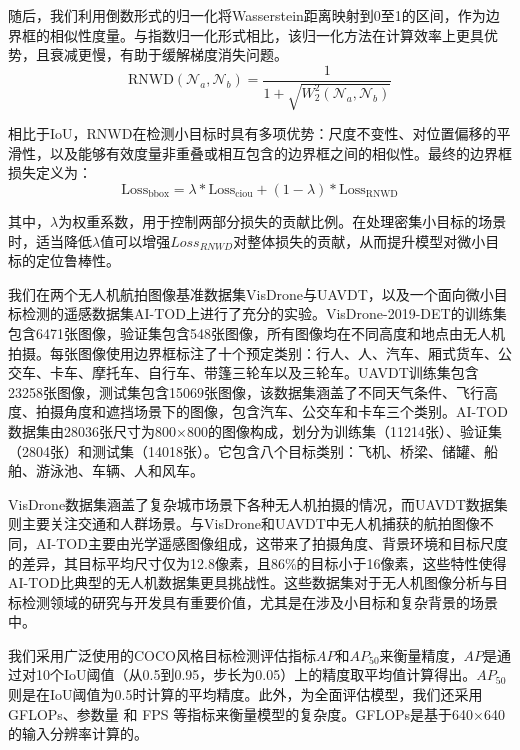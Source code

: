 随后，我们利用倒数形式的归一化将Wasserstein距离映射到0至1的区间，作为边界框的相似性度量。与指数归一化形式相比，该归一化方法在计算效率上更具优势，且衰减更慢，有助于缓解梯度消失问题。
\begin{equation}
    \text{RNWD}(\mathcal{N}_{a}, \mathcal{N}_{b}) = \frac{1}{1 + \sqrt{W_{2}^{2}(\mathcal{N}_{a}, \mathcal{N}_{b})}}
\end{equation}

相比于IoU，RNWD在检测小目标时具有多项优势：尺度不变性、对位置偏移的平滑性，以及能够有效度量非重叠或相互包含的边界框之间的相似性。最终的边界框损失定义为：
\begin{equation}
    \text{Loss}_{\text{bbox}} = \lambda * \text{Loss}_{\text{ciou}} + (1 - \lambda) * \text{Loss}_{\text{RNWD}}
\end{equation}

其中，$\lambda$为权重系数，用于控制两部分损失的贡献比例。在处理密集小目标的场景时，适当降低$\lambda$值可以增强$Loss_{RNWD}$对整体损失的贡献，从而提升模型对微小目标的定位鲁棒性。


我们在两个无人机航拍图像基准数据集VisDrone\cite{Cao2021VisDroneDET2021}与UAVDT\cite{Du2018UAVDT}，以及一个面向微小目标检测的遥感数据集AI-TOD\cite{Wang2021AITOD}上进行了充分的实验。VisDrone-2019-DET的训练集包含6471张图像，验证集包含548张图像，所有图像均在不同高度和地点由无人机拍摄。每张图像使用边界框标注了十个预定类别：行人、人、汽车、厢式货车、公交车、卡车、摩托车、自行车、带篷三轮车以及三轮车。UAVDT训练集包含23258张图像，测试集包含15069张图像，该数据集涵盖了不同天气条件、飞行高度、拍摄角度和遮挡场景下的图像，包含汽车、公交车和卡车三个类别。AI-TOD数据集由28036张尺寸为800×800的图像构成，划分为训练集（11214张）、验证集（2804张）和测试集（14018张）。它包含八个目标类别：飞机、桥梁、储罐、船舶、游泳池、车辆、人和风车。

VisDrone数据集涵盖了复杂城市场景下各种无人机拍摄的情况，而UAVDT数据集则主要关注交通和人群场景。与VisDrone和UAVDT中无人机捕获的航拍图像不同，AI-TOD主要由光学遥感图像组成，这带来了拍摄角度、背景环境和目标尺度的差异，其目标平均尺寸仅为12.8像素，且86\%的目标小于16像素，这些特性使得AI-TOD比典型的无人机数据集更具挑战性。这些数据集对于无人机图像分析与目标检测领域的研究与开发具有重要价值，尤其是在涉及小目标和复杂背景的场景中。

我们采用广泛使用的COCO风格目标检测评估指标$AP$和$AP_{50}$来衡量精度，$AP$是通过对10个IoU阈值（从0.5到0.95，步长为0.05）上的精度取平均值计算得出。$AP_{50}$则是在IoU阈值为0.5时计算的平均精度。此外，为全面评估模型，我们还采用 GFLOPs、参数量 和 FPS 等指标来衡量模型的复杂度。GFLOPs是基于640×640的输入分辨率计算的。


